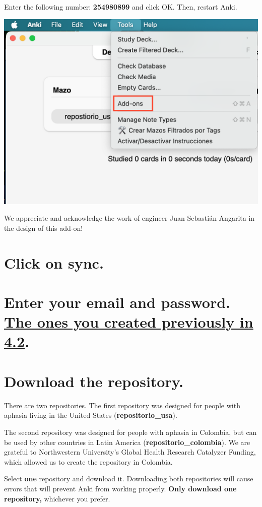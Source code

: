 \documentclass[
]{book}
\begin{document}
Enter the following number: \textbf{254980899} and click OK. Then, restart Anki.

\includegraphics[width=0.6\linewidth]{images/reposit_en/complemento}

We appreciate and acknowledge the work of engineer Juan Sebastián Angarita in the design of this add-on!

\section{Click on sync.}\label{click-on-sync.}

\section{\texorpdfstring{Enter your email and password. \hyperref[cross_3]{The ones you created previously in 4.2}.}{Enter your email and password. The ones you created previously in 4.2.}}\label{enter-your-email-and-password.-the-ones-you-created-previously-in-4.2.}

\section{Download the repository.}\label{download-the-repository.}

There are two repositories. The first repository was designed for people with aphasia living in the United States (\textbf{repositorio\_usa}).

The second repository was designed for people with aphasia in Colombia, but can be used by other countries in Latin America (\textbf{repositorio\_colombia}). We are grateful to Northwestern University's Global Health Research Catalyzer Funding, which allowed us to create the repository in Colombia.

Select \textbf{one} repository and download it. Downloading both repositories will cause errors that will prevent Anki from working properly. \textbf{Only download one repository,} whichever you prefer.
\end{document}
